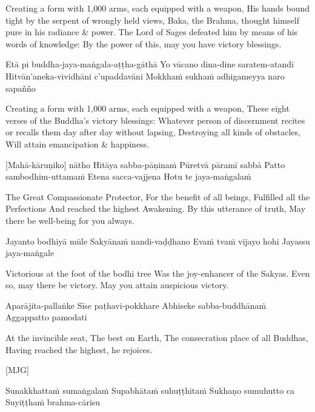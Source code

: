 \begin{english}
  Creating a form with 1,000 arms, each equipped with a weapon,
  His hands bound tight by the serpent of wrongly held views,
  Baka, the Brahma, thought himself pure in his radiance \& power.
  The Lord of Sages defeated him by means of his words of knowledge:
  By the power of this, may you have victory blessings.
\end{english}

Etā pi buddha-jaya-maṅgala-aṭṭha-gāthā
Yo vācano dina-dine saratem-atandī
Hitvān’aneka-vividhāni c’upaddavāni
Mokkhaṁ sukhaṁ adhigameyya naro sapañño

\begin{english}
  Creating a form with 1,000 arms, each equipped with a weapon,
  These eight verses of the Buddha’s victory blessings:
  Whatever person of discernment recites or recalls them day after day without lapsing,
  Destroying all kinds of obstacles,
  Will attain emancipation \& happiness.
\end{english}

\suttaRef{[Trad]}

[Mahā-kāruṇiko] nātho
Hitāya sabba-pāṇinaṁ
Pūretvā pāramī sabbā
Patto sambodhim-uttamaṁ
Etena sacca-vajjena
Hotu te jaya-maṅgalaṁ

\begin{english}
  The Great Compassionate Protector,
  For the benefit of all beings,
  Fulfilled all the Perfections
  And reached the highest Awakening.
  By this utterance of truth,
  May there be well-being for you always.
\end{english}

Jayanto bodhiyā mūle
Sakyānaṁ nandi-vaḍḍhano
Evaṁ tvaṁ vijayo hohi
Jayassu jaya-maṅgale

\begin{english}
  Victorious at the foot of the bodhi tree
  Was the joy-enhancer of the Sakyas.
  Even so, may there be victory.
  May you attain auspicious victory.
\end{english}

Aparājita-pallaṅke
Sīse paṭhavi-pokkhare
Abhiseke sabba-buddhānaṁ
Aggappatto pamodati

\begin{english}
  At the invincible seat,
  The best on Earth,
  The consecration place of all Buddhas,
  Having reached the highest, he rejoices.
\end{english}

[MJG]

Sunakkhattaṁ sumaṅgalaṁ
Supabhātaṁ suhuṭṭhitaṁ
Sukhaṇo sumuhutto ca
Suyiṭṭhaṁ brahma-cārisu


